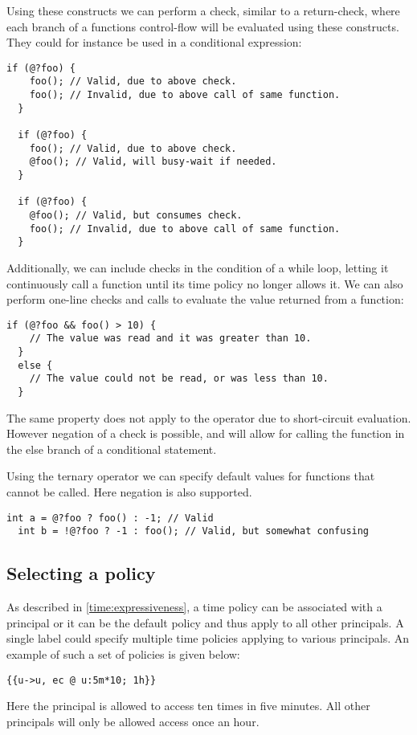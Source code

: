 Using these constructs we can perform a check, similar to a return-check, where each branch of a functions control-flow will be evaluated using these constructs.
They could for instance be used in a conditional expression:
\begin{lstlisting}[style=dlmc]
  if (@?foo) {
    foo(); // Valid, due to above check.
    foo(); // Invalid, due to above call of same function.
  }

  if (@?foo) {
    foo(); // Valid, due to above check.
    @foo(); // Valid, will busy-wait if needed.
  }

  if (@?foo) {
    @foo(); // Valid, but consumes check.
    foo(); // Invalid, due to above call of same function.
  }
\end{lstlisting}
Additionally, we can include checks in the condition of a while loop, letting it continuously call a function until its time policy no longer allows it.
We can also perform one-line checks and calls to evaluate the value returned from a function:
\begin{lstlisting}[style=dlmc]
  if (@?foo && foo() > 10) {
    // The value was read and it was greater than 10.
  }
  else {
    // The value could not be read, or was less than 10.
  }
\end{lstlisting}
The same property does not apply to the \dlmc{||} operator due to short-circuit evaluation.
However negation of a  check is possible, and will allow for calling the function in the else branch of a conditional statement.

Using the ternary operator we can specify default values for functions that cannot be called.
Here negation is also supported.

\begin{lstlisting}[style=dlmc]
  int a = @?foo ? foo() : -1; // Valid
  int b = !@?foo ? -1 : foo(); // Valid, but somewhat confusing
\end{lstlisting}

\subsection{Selecting a policy}\label{time:authority}
As described in \cref{time:expressiveness}, a time policy can be associated with a principal or it can be the default policy and thus apply to all other principals.
A single label could specify multiple time policies applying to various principals.
An example of such a set of policies is given below:
\begin{lstlisting}[style=dlmc]
  {{u->u, ec @ u:5m*10; 1h}}
\end{lstlisting}
Here the principal  is allowed to access ten times in five minutes.
All other principals will only be allowed access once an hour.


